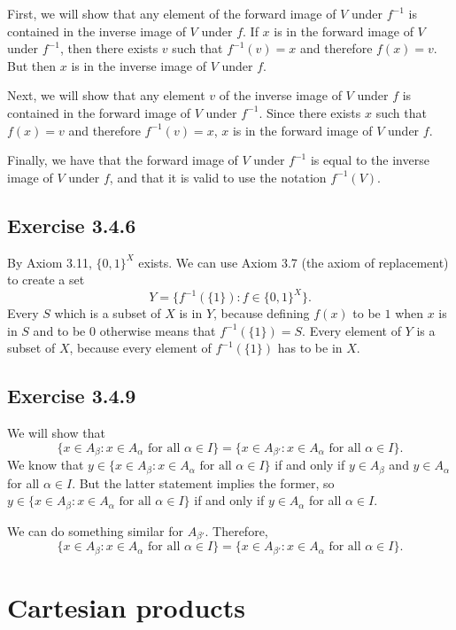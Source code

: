 \documentclass[12pt, oneside]{book}
\begin{document}
	First, we will show that any element of the forward image of $V$ under $f^{-1}$ is contained in the inverse image of $V$ under $f$. If $x$ is in the forward image of $V$ under $f^{-1}$, then there exists $v$ such that $f^{-1}(v) = x$ and therefore $f(x) = v$. But then $x$ is in the inverse image of $V$ under $f$.
	
	Next, we will show that any element $v$ of the inverse image of $V$ under $f$ is contained in the forward image of $V$ under $f^{-1}$. Since there exists $x$ such that $f(x) = v$ and therefore $f^{-1}(v) = x$, $x$ is in the forward image of $V$ under $f$.
	
	Finally, we have that the forward image of $V$ under $f^{-1}$ is equal to the inverse image of $V$ under $f$, and that it is valid to use the notation $f^{-1}(V)$.
	
	\subsection*{Exercise 3.4.6}
	
	By Axiom 3.11, $\{0, 1\}^X$ exists. We can use Axiom 3.7 (the axiom of replacement) to create a set \[Y = \{f^{-1}(\{1\}): f \in \{0, 1\}^X\}.\] Every $S$ which is a subset of $X$ is in $Y$, because defining $f(x)$ to be $1$ when $x$ is in $S$ and to be $0$ otherwise means that $f^{-1}(\{1\}) = S$. Every element of $Y$ is a subset of $X$, because every element of $f^{-1}(\{1\})$ has to be in $X$.
	
	\subsection*{Exercise 3.4.9}
	
	We will show that \[\{x \in A_\beta: x \in A_\alpha \text{ for all } \alpha \in I\} = \{x \in A_{\beta'}: x \in A_\alpha \text{ for all } \alpha \in I\}.\] We know that $y \in \{x \in A_\beta: x \in A_\alpha \text{ for all } \alpha \in I\}$ if and only if $y \in A_\beta$ and $y \in A_\alpha$ for all $\alpha \in I$. But the latter statement implies the former, so $y \in \{x \in A_\beta: x \in A_\alpha \text{ for all } \alpha \in I\}$ if and only if $y \in A_\alpha$ for all $\alpha \in I$.
	
	We can do something similar for $A_{\beta'}$. Therefore, \[\{x \in A_\beta: x \in A_\alpha \text{ for all } \alpha \in I\} = \{x \in A_{\beta'}: x \in A_\alpha \text{ for all } \alpha \in I\}.\]
	
	\section{Cartesian products}
	
\end{document}
